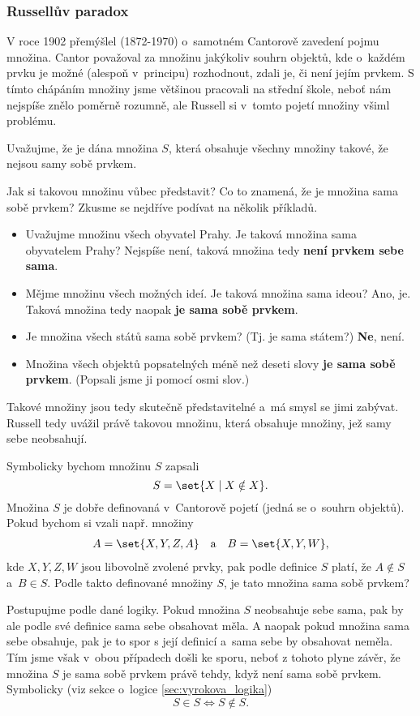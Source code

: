 \subsubsection{Russellův paradox}
V roce 1902 přemýšlel  \mbox{(1872-1970)} o~samotném Cantorově zavedení pojmu množina. Cantor považoval za množinu jakýkoliv souhrn objektů, kde o~každém prvku je možné (alespoň v~principu) rozhodnout, zdali je, či není jejím prvkem. S tímto chápáním množiny jsme většinou pracovali na střední škole, neboť nám nejspíše znělo poměrně rozumně, ale Russell si v~tomto pojetí množiny všiml problému.\par
Uvažujme, že je dána množina $S$, která obsahuje všechny množiny takové, že nejsou samy sobě prvkem.\par
Jak si takovou množinu vůbec představit? Co to znamená, že je množina sama sobě prvkem? Zkusme se nejdříve podívat na několik příkladů.
\begin{itemize}
    \item Uvažujme množinu všech obyvatel Prahy. Je taková množina sama obyvatelem Prahy? Nejspíše není, taková množina tedy \textbf{není prvkem sebe sama}.
    \item Mějme množinu všech možných ideí. Je taková množina sama ideou? Ano, je. Taková množina tedy naopak \textbf{je sama sobě prvkem}.
    \item Je množina všech států sama sobě prvkem? (Tj. je sama státem?) \textbf{Ne}, není.
    \item Množina všech objektů popsatelných méně než deseti slovy \textbf{je sama sobě prvkem}. (Popsali jsme ji pomocí osmi slov.)
\end{itemize}
Takové množiny jsou tedy skutečně představitelné a~má smysl se jimi zabývat. Russell tedy uvážil právě takovou množinu, která obsahuje množiny, jež samy sebe neobsahují.

Symbolicky bychom množinu $S$ zapsali
\begin{equation*}
S=\set{X \mid X \notin X}.
\end{equation*}
Množina $S$ je dobře definovaná v~Cantorově pojetí (jedná se o~souhrn objektů). Pokud bychom si vzali např. množiny
\begin{align*}
A=\set{X,Y,Z,A} \quad \text{a} \quad B=\set{X,Y,W},
\end{align*}
kde $X,Y,Z,W$ jsou libovolně zvolené prvky, pak podle definice $S$ platí, že $A \notin S$ a~$B \in S$. Podle takto definované množiny $S$, je tato množina sama sobě prvkem?\par
Postupujme podle dané logiky. Pokud množina $S$ neobsahuje sebe sama, pak by ale podle své definice sama sebe obsahovat měla. A naopak pokud množina sama sebe obsahuje, pak je to spor s její definicí a~sama sebe by obsahovat neměla. Tím jsme však v~obou případech došli ke sporu, neboť z tohoto plyne závěr, že množina $S$ je sama sobě prvkem právě tehdy, když není sama sobě prvkem. Symbolicky (viz sekce o~logice \ref{sec:vyrokova_logika})
\begin{equation*}
S \in S \iff S \notin S.
\end{equation*}

